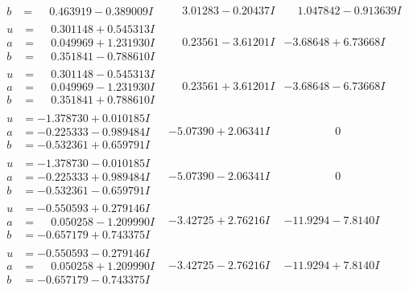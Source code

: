\documentclass[1p]{elsarticle_modified}
\theoremstyle{definition}
\begin{document}
$$\begin{array}{c|c|c}
\begin{aligned}
b &= \phantom{-}0.463919 - 0.389009 I\end{aligned}
 & \phantom{-}3.01283 - 0.20437 I & \phantom{-}1.047842 - 0.913639 I \\ \hline\begin{aligned}
u &= \phantom{-}0.301148 + 0.545313 I \\
a &= \phantom{-}0.049969 + 1.231930 I \\
b &= \phantom{-}0.351841 - 0.788610 I\end{aligned}
 & \phantom{-}0.23561 - 3.61201 I & -3.68648 + 6.73668 I \\ \hline\begin{aligned}
u &= \phantom{-}0.301148 - 0.545313 I \\
a &= \phantom{-}0.049969 - 1.231930 I \\
b &= \phantom{-}0.351841 + 0.788610 I\end{aligned}
 & \phantom{-}0.23561 + 3.61201 I & -3.68648 - 6.73668 I \\ \hline\begin{aligned}
u &= -1.378730 + 0.010185 I \\
a &= -0.225333 - 0.989484 I \\
b &= -0.532361 + 0.659791 I\end{aligned}
 & -5.07390 + 2.06341 I & \phantom{-0.000000 } 0 \\ \hline\begin{aligned}
u &= -1.378730 - 0.010185 I \\
a &= -0.225333 + 0.989484 I \\
b &= -0.532361 - 0.659791 I\end{aligned}
 & -5.07390 - 2.06341 I & \phantom{-0.000000 } 0 \\ \hline\begin{aligned}
u &= -0.550593 + 0.279146 I \\
a &= \phantom{-}0.050258 - 1.209990 I \\
b &= -0.657179 + 0.743375 I\end{aligned}
 & -3.42725 + 2.76216 I & -11.9294 - 7.8140 I \\ \hline\begin{aligned}
u &= -0.550593 - 0.279146 I \\
a &= \phantom{-}0.050258 + 1.209990 I \\
b &= -0.657179 - 0.743375 I\end{aligned}
 & -3.42725 - 2.76216 I & -11.9294 + 7.8140 I \\ \hline\begin{aligned}

\end{aligned}
\end{array}$$
\end{document}
